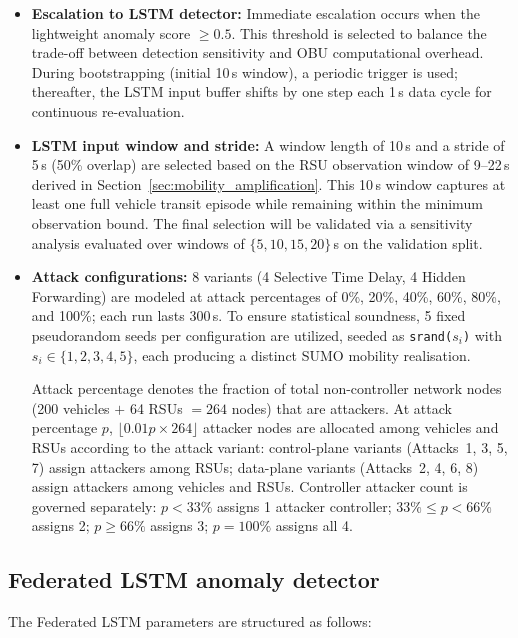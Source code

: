 \documentclass[12pt, a4paper]{report}
\begin{document}
{{\begin{itemize}
    \item \textbf{Escalation to LSTM detector:} Immediate escalation occurs when the lightweight anomaly score $\geq 0.5$. This threshold is selected to balance the trade-off between detection sensitivity and OBU computational overhead. During bootstrapping (initial 10\,s window), a periodic trigger is used; thereafter, the LSTM input buffer shifts by one step each 1\,s data cycle for continuous re-evaluation.
    \item \textbf{LSTM input window and stride:} A window length of 10\,s and a stride of 5\,s (50\% overlap) are selected based on the RSU observation window of 9--22\,s derived in Section~\ref{sec:mobility_amplification}. This 10\,s window captures at least one full vehicle transit episode while remaining within the minimum observation bound. The final selection will be validated via a sensitivity analysis evaluated over windows of $\{5, 10, 15, 20\}$\,s on the validation split.
    \item \textbf{Attack configurations:} 8 variants (4 Selective Time Delay, 4 Hidden Forwarding) are modeled at attack percentages of 0\%, 20\%, 40\%, 60\%, 80\%, and 100\%; each run lasts 300\,s. To ensure statistical soundness, 5 fixed pseudorandom seeds per configuration are utilized, seeded as \texttt{srand($s_i$)} with $s_i \in \{1,2,3,4,5\}$, each producing a distinct SUMO mobility realisation.

    Attack percentage denotes the fraction of total
non-controller network nodes (200 vehicles $+$
64 RSUs $= 264$ nodes) that are attackers.
At attack percentage $p$,
$\lfloor 0.01p \times 264 \rfloor$ attacker nodes
are allocated among vehicles and RSUs according
to the attack variant: control-plane variants
(Attacks~1, 3, 5, 7) assign attackers among RSUs;
data-plane variants (Attacks~2, 4, 6, 8) assign
attackers among vehicles and RSUs.
Controller attacker count is governed separately:
$p < 33\%$ assigns 1 attacker controller;
$33\% \leq p < 66\%$ assigns 2;
$p \geq 66\%$ assigns 3; $p = 100\%$ assigns all 4.

\end{itemize}

\subsection{Federated LSTM anomaly detector}
\label{sec:fed_lstm}
The Federated LSTM parameters are structured as follows:

}}
\end{document}
